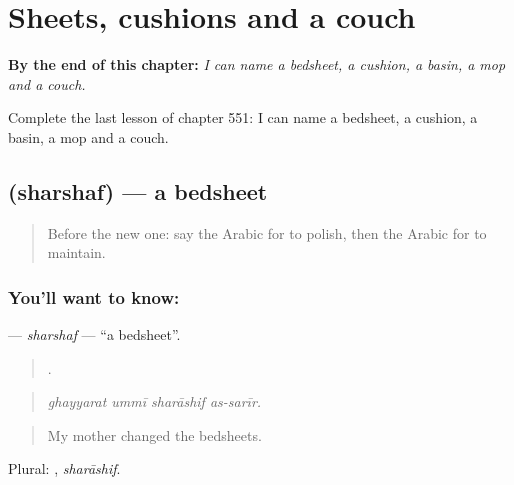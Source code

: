
\chapter{Sheets, cushions and a couch}
\label{ch:ar-sheets-cushions-and-a-couch}

\begin{chapteropening}
\textbf{By the end of this chapter:} \emph{I can name a bedsheet, a cushion, a basin, a mop and a couch.}

Complete the last lesson of chapter 551: I can name a bedsheet, a cushion, a basin, a mop and a couch.
\end{chapteropening}

\section[\texorpdfstring{\ar{شرشف} (sharshaf)}{شرشف (sharshaf)}]{ (sharshaf) — a bedsheet}

\label{lesson:AR-C551-sharshaf}



\begin{quote}
Before the new one: say the Arabic for to polish, then the Arabic for to maintain.
\end{quote}

\subsection*{You'll want to know: }
\textbf{} — \emph{sharshaf} — \textquotedblleft{}a bedsheet\textquotedblright{}.

\begin{quote}
   .
\end{quote}

\begin{quote}
\emph{ghayyarat ummī sharāshif as-sarīr.}
\end{quote}

\begin{quote}
My mother changed the bedsheets.
\end{quote}

Plural: , \emph{sharāshif}.

